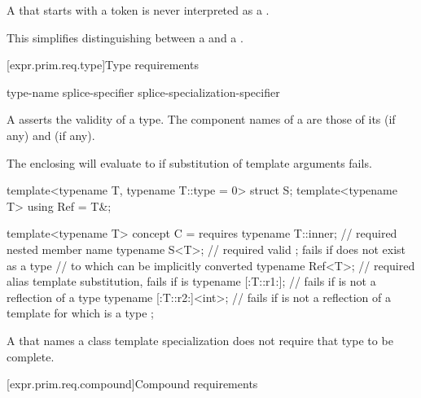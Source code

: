 \pnum
A  that starts with a  token
is never interpreted as a .
\begin{note}
This simplifies distinguishing between a 
and a .
\end{note}

[expr.prim.req.type]{Type requirements}
%

\begin{bnf}
\br
      type-name \terminal{;}\br
     splice-specifier \terminal{;}\br
     splice-specialization-specifier \terminal{;}
\end{bnf}

\pnum
A  asserts the validity of a type.
The component names of a  are those of its
 (if any) and
 (if any).
\begin{note}
The enclosing  will evaluate to 
if substitution of template arguments fails.
\end{note}
\begin{example}
\begin{codeblock}
template<typename T, typename T::type = 0> struct S;
template<typename T> using Ref = T&;

template<typename T> concept C = requires {
  typename T::inner;        // required nested member name
  typename S<T>;            // required valid ; fails if  does not exist as a type
                            // to which  can be implicitly converted
  typename Ref<T>;          // required alias template substitution, fails if  is 
  typename [:T::r1:];       // fails if  is not a reflection of a type
  typename [:T::r2:]<int>;  // fails if  is not a reflection of a template  for which  is a type
};
\end{codeblock}
\end{example}

\pnum
A  that names a class template specialization
does not require that type to be complete.

[expr.prim.req.compound]{Compound requirements}
%

